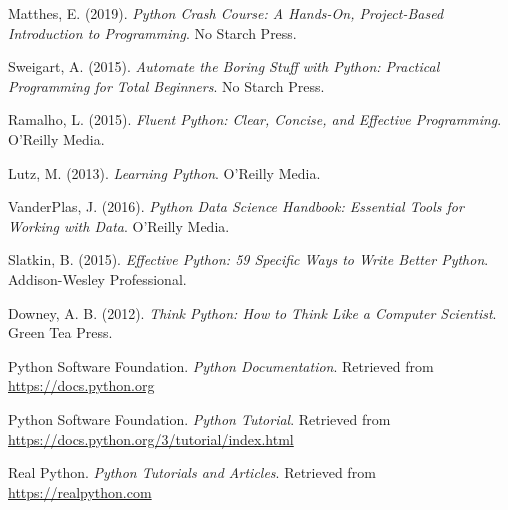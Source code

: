 \documentclass[12pt]{article}
\begin{document}
\begin{thebibliography}{9}

 Matthes, E. (2019). \textit{Python Crash Course: A Hands-On, Project-Based Introduction to Programming}. No Starch Press.

 Sweigart, A. (2015). \textit{Automate the Boring Stuff with Python: Practical Programming for Total Beginners}. No Starch Press.

 Ramalho, L. (2015). \textit{Fluent Python: Clear, Concise, and Effective Programming}. O'Reilly Media.

 Lutz, M. (2013). \textit{Learning Python}. O'Reilly Media.

 VanderPlas, J. (2016). \textit{Python Data Science Handbook: Essential Tools for Working with Data}. O'Reilly Media.

 Slatkin, B. (2015). \textit{Effective Python: 59 Specific Ways to Write Better Python}. Addison-Wesley Professional.

 Downey, A. B. (2012). \textit{Think Python: How to Think Like a Computer Scientist}. Green Tea Press.

 Python Software Foundation. \textit{Python Documentation}. Retrieved from \url{https://docs.python.org}

 Python Software Foundation. \textit{Python Tutorial}. Retrieved from \url{https://docs.python.org/3/tutorial/index.html}

 Real Python. \textit{Python Tutorials and Articles}. Retrieved from \url{https://realpython.com}

\end{thebibliography}

\newpage
\printbibliography
\end{document}
